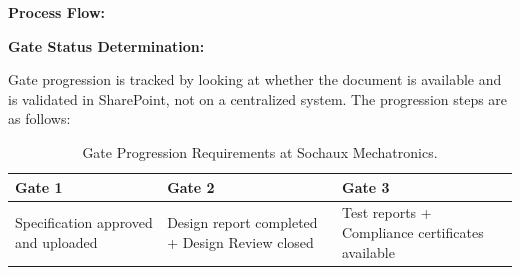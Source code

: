 \vspace{0.3cm}

\noindent\textbf{Process Flow:}

\vspace{0.3cm}

\noindent{}

\vspace{0.3cm}

\noindent\textbf{Gate Status Determination:}

Gate progression is tracked by looking at whether the document is available and is validated in SharePoint, not on a centralized system. The progression steps are as follows:
\vspace{0.3cm}

\begin{table}[H]
\centering
\small
\setlength{\tabcolsep}{8pt}
\renewcommand{\arraystretch}{2.2}
\caption{Gate Progression Requirements at Sochaux Mechatronics.}
\label{tab:gate-progression}
\begin{tabularx}{\textwidth}{|>{\raggedright\arraybackslash}X|>{\raggedright\arraybackslash}X|>{\raggedright\arraybackslash}X|}
\hline
\cellcolor[HTML]{E6F2FF}\textcolor[HTML]{003D99}{\textbf{Gate 1}} & \cellcolor[HTML]{E6F2FF}\textcolor[HTML]{003D99}{\textbf{Gate 2}} & \cellcolor[HTML]{E6F2FF}\textcolor[HTML]{003D99}{\textbf{Gate 3}} \\
\hline
Specification approved and uploaded & Design report completed + Design Review closed & Test reports + Compliance certificates available \\
\hline
\end{tabularx}
\end{table}

